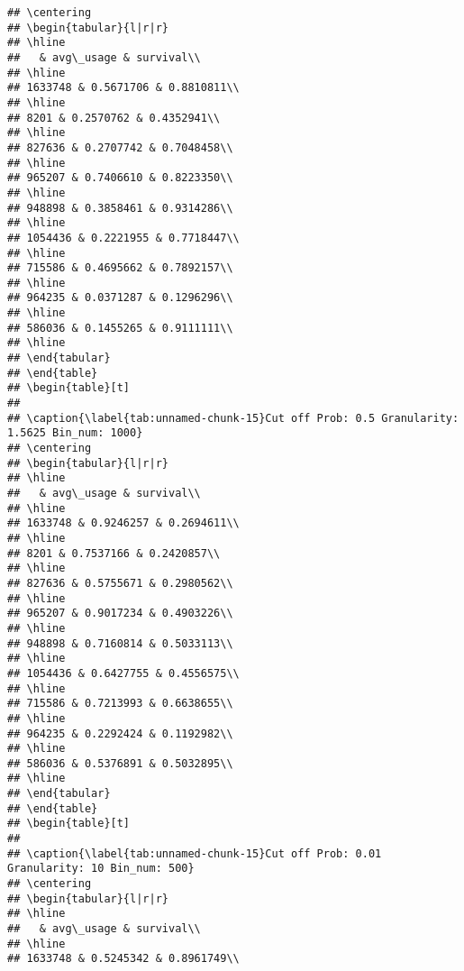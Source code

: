 \documentclass[]{article}
\begin{document}
\begin{verbatim}
## \centering
## \begin{tabular}{l|r|r}
## \hline
##   & avg\_usage & survival\\
## \hline
## 1633748 & 0.5671706 & 0.8810811\\
## \hline
## 8201 & 0.2570762 & 0.4352941\\
## \hline
## 827636 & 0.2707742 & 0.7048458\\
## \hline
## 965207 & 0.7406610 & 0.8223350\\
## \hline
## 948898 & 0.3858461 & 0.9314286\\
## \hline
## 1054436 & 0.2221955 & 0.7718447\\
## \hline
## 715586 & 0.4695662 & 0.7892157\\
## \hline
## 964235 & 0.0371287 & 0.1296296\\
## \hline
## 586036 & 0.1455265 & 0.9111111\\
## \hline
## \end{tabular}
## \end{table}
## \begin{table}[t]
## 
## \caption{\label{tab:unnamed-chunk-15}Cut off Prob: 0.5 Granularity: 1.5625 Bin_num: 1000}
## \centering
## \begin{tabular}{l|r|r}
## \hline
##   & avg\_usage & survival\\
## \hline
## 1633748 & 0.9246257 & 0.2694611\\
## \hline
## 8201 & 0.7537166 & 0.2420857\\
## \hline
## 827636 & 0.5755671 & 0.2980562\\
## \hline
## 965207 & 0.9017234 & 0.4903226\\
## \hline
## 948898 & 0.7160814 & 0.5033113\\
## \hline
## 1054436 & 0.6427755 & 0.4556575\\
## \hline
## 715586 & 0.7213993 & 0.6638655\\
## \hline
## 964235 & 0.2292424 & 0.1192982\\
## \hline
## 586036 & 0.5376891 & 0.5032895\\
## \hline
## \end{tabular}
## \end{table}
## \begin{table}[t]
## 
## \caption{\label{tab:unnamed-chunk-15}Cut off Prob: 0.01 Granularity: 10 Bin_num: 500}
## \centering
## \begin{tabular}{l|r|r}
## \hline
##   & avg\_usage & survival\\
## \hline
## 1633748 & 0.5245342 & 0.8961749\\

\end{verbatim}
\end{document}
